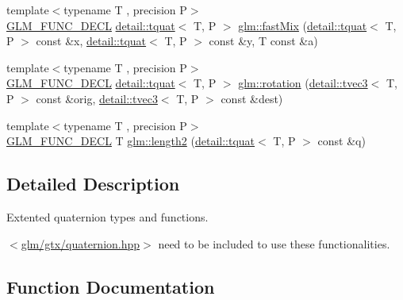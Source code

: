 \begin{DoxyCompactItemize}
\item 
{\footnotesize template$<$typename T , precision P$>$ }\\\hyperlink{setup_8hpp_ab2d052de21a70539923e9bcbf6e83a51}{G\+L\+M\+\_\+\+F\+U\+N\+C\+\_\+\+D\+E\+CL} \hyperlink{structglm_1_1detail_1_1tquat}{detail\+::tquat}$<$ T, P $>$ \hyperlink{group__gtx__quaternion_ga5d1bb2670d0c73fff5912134ba7c024c}{glm\+::fast\+Mix} (\hyperlink{structglm_1_1detail_1_1tquat}{detail\+::tquat}$<$ T, P $>$ const \&x, \hyperlink{structglm_1_1detail_1_1tquat}{detail\+::tquat}$<$ T, P $>$ const \&y, T const \&a)
\item 
{\footnotesize template$<$typename T , precision P$>$ }\\\hyperlink{setup_8hpp_ab2d052de21a70539923e9bcbf6e83a51}{G\+L\+M\+\_\+\+F\+U\+N\+C\+\_\+\+D\+E\+CL} \hyperlink{structglm_1_1detail_1_1tquat}{detail\+::tquat}$<$ T, P $>$ \hyperlink{group__gtx__quaternion_ga964b26fdcd9f6f694c1003b0571092a6}{glm\+::rotation} (\hyperlink{structglm_1_1detail_1_1tvec3}{detail\+::tvec3}$<$ T, P $>$ const \&orig, \hyperlink{structglm_1_1detail_1_1tvec3}{detail\+::tvec3}$<$ T, P $>$ const \&dest)
\item 
{\footnotesize template$<$typename T , precision P$>$ }\\\hyperlink{setup_8hpp_ab2d052de21a70539923e9bcbf6e83a51}{G\+L\+M\+\_\+\+F\+U\+N\+C\+\_\+\+D\+E\+CL} T \hyperlink{group__gtx__quaternion_gaac8d704c7dfac92835109953b88f1c92}{glm\+::length2} (\hyperlink{structglm_1_1detail_1_1tquat}{detail\+::tquat}$<$ T, P $>$ const \&q)
\end{DoxyCompactItemize}


\subsection{Detailed Description}
Extented quaternion types and functions. 

$<$\hyperlink{gtx_2quaternion_8hpp}{glm/gtx/quaternion.\+hpp}$>$ need to be included to use these functionalities. 

\subsection{Function Documentation}
\mbox{\label{group__gtx__quaternion_ga8b5c3ff869c773f26d0a562dfcd3f9e4}} 
